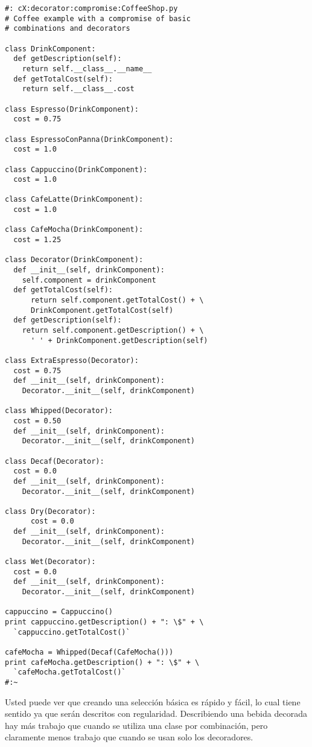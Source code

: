 \begin{lstlisting} 
#: cX:decorator:compromise:CoffeeShop.py 
# Coffee example with a compromise of basic 
# combinations and decorators 

class DrinkComponent: 
  def getDescription(self): 
    return self.__class__.__name__ 
  def getTotalCost(self): 
    return self.__class__.cost 
    
class Espresso(DrinkComponent): 
  cost = 0.75 
  
class EspressoConPanna(DrinkComponent): 
  cost = 1.0 
  
class Cappuccino(DrinkComponent): 
  cost = 1.0 
  
class CafeLatte(DrinkComponent): 
  cost = 1.0 
  
class CafeMocha(DrinkComponent): 
  cost = 1.25 
  
class Decorator(DrinkComponent): 
  def __init__(self, drinkComponent): 
    self.component = drinkComponent 
  def getTotalCost(self): 
      return self.component.getTotalCost() + \ 
      DrinkComponent.getTotalCost(self) 
  def getDescription(self): 
    return self.component.getDescription() + \ 
      ' ' + DrinkComponent.getDescription(self) 
      
class ExtraEspresso(Decorator): 
  cost = 0.75 
  def __init__(self, drinkComponent): 
    Decorator.__init__(self, drinkComponent) 
    
class Whipped(Decorator): 
  cost = 0.50 
  def __init__(self, drinkComponent): 
    Decorator.__init__(self, drinkComponent) 
    
class Decaf(Decorator): 
  cost = 0.0 
  def __init__(self, drinkComponent): 
    Decorator.__init__(self, drinkComponent) 
    
class Dry(Decorator): 
      cost = 0.0 
  def __init__(self, drinkComponent): 
    Decorator.__init__(self, drinkComponent) 
    
class Wet(Decorator): 
  cost = 0.0 
  def __init__(self, drinkComponent): 
    Decorator.__init__(self, drinkComponent) 
    
cappuccino = Cappuccino() 
print cappuccino.getDescription() + ": \$" + \ 
  `cappuccino.getTotalCost()` 
  
cafeMocha = Whipped(Decaf(CafeMocha())) 
print cafeMocha.getDescription() + ": \$" + \ 
  `cafeMocha.getTotalCost()` 
#:~ 
\end{lstlisting}

Usted puede ver que creando una selección básica es rápido y fácil, lo cual tiene sentido ya que serán descritos con regularidad. Describiendo una bebida decorada hay más trabajo que cuando se utiliza una clase por combinación, pero claramente menos trabajo que cuando se usan solo los decoradores.    \newline

